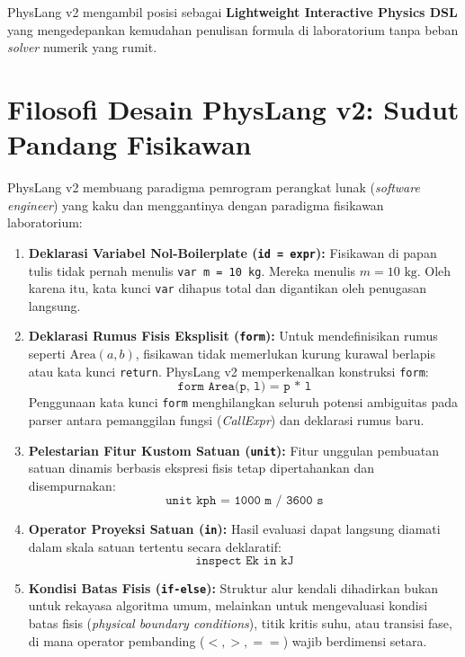 \documentclass[11pt,a4paper]{article}
\begin{document}
PhysLang v2 mengambil posisi sebagai \textbf{Lightweight Interactive Physics DSL} yang mengedepankan kemudahan penulisan formula di laboratorium tanpa beban \textit{solver} numerik yang rumit.

\section{Filosofi Desain PhysLang v2: Sudut Pandang Fisikawan}

PhysLang v2 membuang paradigma pemrogram perangkat lunak (\textit{software engineer}) yang kaku dan menggantinya dengan paradigma fisikawan laboratorium:
\begin{enumerate}
    \item \textbf{Deklarasi Variabel Nol-Boilerplate (\texttt{id = expr}):}
    Fisikawan di papan tulis tidak pernah menulis \texttt{var m = 10 kg}. Mereka menulis $m = 10\text{ kg}$. Oleh karena itu, kata kunci \texttt{var} dihapus total dan digantikan oleh penugasan langsung.
    
    \item \textbf{Deklarasi Rumus Fisis Eksplisit (\texttt{form}):}
    Untuk mendefinisikan rumus seperti $\text{Area}(a, b)$, fisikawan tidak memerlukan kurung kurawal berlapis atau kata kunci \texttt{return}. PhysLang v2 memperkenalkan konstruksi \texttt{form}:
    \begin{equation*}
        \texttt{form Area(p, l) = p * l}
    \end{equation*}
    Penggunaan kata kunci \texttt{form} menghilangkan seluruh potensi ambiguitas pada parser antara pemanggilan fungsi (\textit{CallExpr}) dan deklarasi rumus baru.
    
    \item \textbf{Pelestarian Fitur Kustom Satuan (\texttt{unit}):}
    Fitur unggulan pembuatan satuan dinamis berbasis ekspresi fisis tetap dipertahankan dan disempurnakan:
    \begin{equation*}
        \texttt{unit kph = 1000 m / 3600 s}
    \end{equation*}
    
    \item \textbf{Operator Proyeksi Satuan (\texttt{in}):}
    Hasil evaluasi dapat langsung diamati dalam skala satuan tertentu secara deklaratif:
    \begin{equation*}
        \texttt{inspect Ek in kJ}
    \end{equation*}
    
    \item \textbf{Kondisi Batas Fisis (\texttt{if-else}):}
    Struktur alur kendali dihadirkan bukan untuk rekayasa algoritma umum, melainkan untuk mengevaluasi kondisi batas fisis (\textit{physical boundary conditions}), titik kritis suhu, atau transisi fase, di mana operator pembanding ($<, >, ==$) wajib berdimensi setara.
\end{enumerate}
\end{document}
